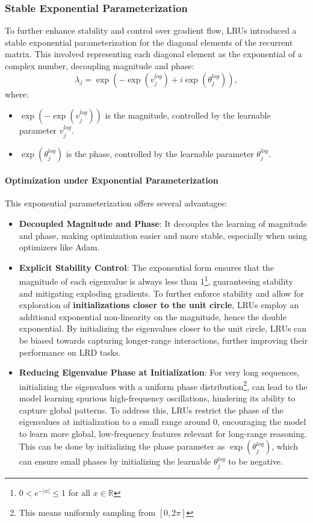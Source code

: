 \documentclass[12pt,a4paper]{report}
\begin{document}
\subsubsection{Stable Exponential Parameterization}
To further enhance stability and control over gradient flow, LRUs introduced a stable exponential parameterization for the diagonal elements of the recurrent matrix. This involved representing each diagonal element as the exponential of a complex number, decoupling magnitude and phase:
\[\lambda_j = \exp(-\exp(v_j^{log}) + i \exp(\theta_j^{log})),\]
where:
\begin{itemize}
    \item $\exp(-\exp(v_j^{log}))$ is the magnitude, controlled by the learnable parameter $v_j^{log}$.
    \item $\exp(\theta_j^{log})$ is the phase, controlled by the learnable parameter $\theta_j^{log}$.
\end{itemize}

\paragraph{Optimization under Exponential Parameterization} 
This exponential parameterization offers several advantages:
\begin{itemize}
    \item \textbf{Decoupled Magnitude and Phase}: It decouples the learning of magnitude and phase, making optimization easier and more stable, especially when using optimizers like Adam.
    \item \textbf{Explicit Stability Control}: The exponential form ensures that the magnitude of each eigenvalue is always less than 1\footnote{$0 < e^{-|x|} \le 1$ for all $x \in \mathbb{R}$}, guaranteeing stability and mitigating exploding gradients. To further enforce stability and allow for exploration of \textbf{initializations closer to the unit circle}, LRUs employ an additional exponential non-linearity on the magnitude, hence the double exponential. By initializing the eigenvalues closer to the unit circle, LRUs can be biased towards capturing longer-range interactions, further improving their performance on LRD tasks.
    \item \textbf{Reducing Eigenvalue Phase at Initialization}: For very long sequences, initializing the eigenvalues with a uniform phase distribution\footnote{This means uniformly sampling from $[0,2\pi]$}, can lead to the model learning spurious high-frequency oscillations, hindering its ability to capture global patterns. To address this, LRUs restrict the phase of the eigenvalues at initialization to a small range around 0, encouraging the model to learn more global, low-frequency features relevant for long-range reasoning. This can be done by initializing the phase parameter as $\exp(\theta_j^{log})$, which can ensure small phases by initializing the learnable $\theta_j^{log}$ to be negative.
\end{itemize}
\end{document}
